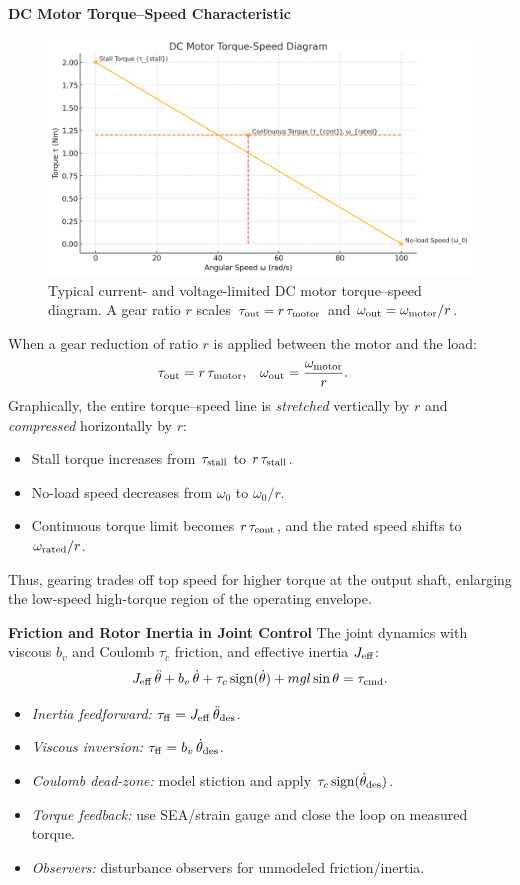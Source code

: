 \documentclass[12pt,a4paper]{article}
\begin{document}
\textbf{DC Motor Torque–Speed Characteristic}

\begin{figure}[htbp]
  \centering
  \includegraphics[width=0.9\linewidth]{../figs/output.png}
  \caption{Typical current- and voltage-limited DC motor torque–speed diagram.  
  A gear ratio $r$ scales $\tau_{\rm out} = r\,\tau_{\rm motor}$ and $\omega_{\rm out} = \omega_{\rm motor}/r$.}
  \label{fig:torque_speed}
\end{figure}
When a gear reduction of ratio \(r\) is applied between the motor and the load:
\begin{align*}
  \tau_{\rm out} &= r \,\tau_{\rm motor},   &
  \omega_{\rm out} &= \frac{\omega_{\rm motor}}{r}.
\end{align*}
Graphically, the entire torque–speed line is \emph{stretched} vertically by \(r\) and \emph{compressed} horizontally by \(r\):
\begin{itemize}
  \item Stall torque increases from \(\tau_{\rm stall}\) to \(r\,\tau_{\rm stall}\).
  \item No-load speed decreases from \(\omega_0\) to \(\omega_0/r\).
  \item Continuous torque limit becomes \(r\,\tau_{\rm cont}\), and the rated speed shifts to \(\omega_{\rm rated}/r\).
\end{itemize}
Thus, gearing trades off top speed for higher torque at the output shaft, enlarging the low-speed high-torque region of the operating envelope.


\textbf{Friction and Rotor Inertia in Joint Control}
The joint dynamics with viscous $b_v$ and Coulomb $\tau_c$ friction, and effective inertia $J_{\rm eff}$:
\[
J_{\rm eff}\,\ddot\theta + b_v\,\dot\theta + \tau_c\,\mathrm{sign}(\dot\theta)
+ mgl\sin\theta
= \tau_{\rm cmd}.
\]
\begin{itemize}
  \item \emph{Inertia feedforward:} $\tau_{\rm ff}=J_{\rm eff}\,\ddot\theta_{\rm des}$.
  \item \emph{Viscous inversion:} $\tau_{\rm ff}=b_v\,\dot\theta_{\rm des}$.
  \item \emph{Coulomb dead-zone:} model stiction and apply $\tau_c\,\mathrm{sign}(\dot\theta_{\rm des})$.
  \item \emph{Torque feedback:} use SEA/strain gauge and close the loop on measured torque.
  \item \emph{Observers:} disturbance observers for unmodeled friction/inertia.
\end{itemize}
\end{document}
